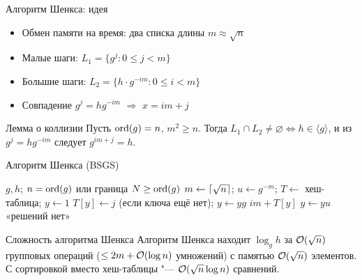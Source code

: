 \documentclass{ca-slides}
\begin{document}
\begin{canvasframe}{Алгоритм Шенкса: идея}
  \begin{itemize}
    \item Обмен памяти на время: два списка длины $m \approx \sqrt n$
    \item Малые шаги: $L_1 = \{g^j : 0 \le j < m\}$
    \item Большие шаги: $L_2 = \{h \cdot g^{-im} : 0 \le i < m\}$
    \item Совпадение $g^j = h g^{-im}$ $\Rightarrow$ $x = im + j$
  \end{itemize}
  \centering
  \penspace[0.12\textheight]
\end{canvasframe}

\begin{theoremframe}[lemma]{Лемма о коллизии}
  Пусть $\operatorname{ord}(g) = n$, $m^2 \ge n$. Тогда $L_1 \cap L_2 \ne \varnothing \iff h \in \langle g
  \rangle$, и из $g^j = h g^{-im}$ следует $g^{im + j} = h$.
\end{theoremframe}

\begin{canvasframe}{Алгоритм Шенкса (BSGS)}
  \footnotesize
  \begin{algorithm}[Шенкс]
  \begin{algorithmic}[1]
    \Require $g, h$; $n = \operatorname{ord}(g)$ или граница $N \ge \operatorname{ord}(g)$
    \State $m \gets \lceil\sqrt n\rceil$; $u \gets g^{-m}$; $T \gets$ хеш-таблица; $y \gets 1$
     \State $T[y] \gets j$ (если ключа ещё нет); $y \gets yg$ \EndFor
       \Return $im + T[y]$ \EndIf
      \State $y \gets y u$
    \EndFor
    \State \Return «решений нет»
  \end{algorithmic}
  \end{algorithm}
\end{canvasframe}

\begin{theoremframe}{Сложность алгоритма Шенкса}
  Алгоритм Шенкса находит $\log_g h$ за $\mathcal{O}(\sqrt n)$ групповых операций
  ($\le 2m + \mathcal{O}(\log n)$ умножений) с памятью $\mathcal{O}(\sqrt n)$ элементов. С сортировкой вместо
  хеш-таблицы "--- $\mathcal{O}(\sqrt n \log n)$ сравнений.
\end{theoremframe}
\end{document}
